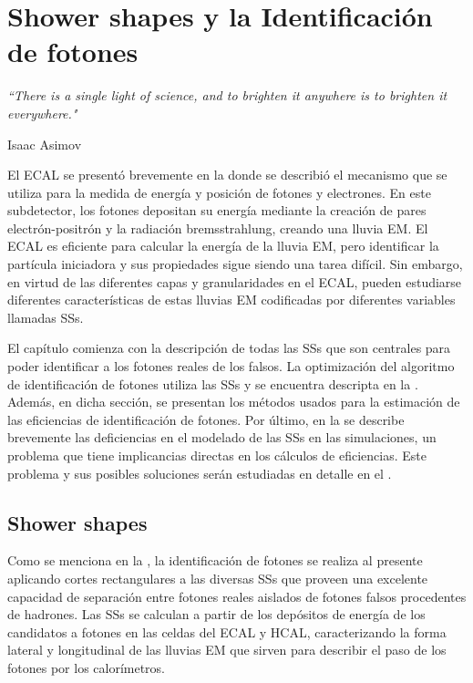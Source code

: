 \chapter{Shower shapes y la Identificación de fotones}
\label{ch:pid_ss}
\epigraph{\emph{``There is a single light of science, and to brighten it anywhere is to brighten it everywhere."}}{Isaac Asimov}




El \ac{ECAL} se presentó brevemente en la \Sect{\ref{subsubsec:atlas:atlas:cals:ecal}} donde se describió el mecanismo que se utiliza para la medida de energía y posición de fotones y electrones. En este subdetector, los fotones depositan su energía mediante la creación de pares electrón-positrón y la radiación bremsstrahlung, creando una lluvia \acf{EM}. El \ac{ECAL} es eficiente para calcular la energía de la lluvia \ac{EM}, pero identificar la partícula iniciadora y sus propiedades sigue siendo una tarea difícil.
Sin embargo, en virtud de las diferentes capas y granularidades en el \ac{ECAL}, pueden estudiarse diferentes características de estas lluvias \ac{EM} codificadas por diferentes variables llamadas \acfp{SS}.

El capítulo comienza con la descripción de todas las \acp{SS} que son centrales para poder identificar a los fotones reales de los falsos.
La optimización del algoritmo de identificación de fotones utiliza las \acp{SS} y se encuentra descripta en la \Sect{\ref{sec:pid_ss:pid}}. Además, en dicha sección, se presentan los métodos usados para la estimación de las eficiencias de identificación de fotones.
Por último, en la \Sect{\ref{sec:pid_ss:ss_differences}} se describe brevemente las deficiencias en el modelado de las \acp{SS} en las simulaciones, un problema que tiene implicancias directas en los cálculos de eficiencias. Este problema y sus posibles soluciones serán estudiadas en detalle en el \Ch{\ref{ch:ss_corrections}}.






\section{Shower shapes}
\label{sec:pid_ss:ss}

Como se menciona en la \Sect{\ref{subsec:objects:egamma:id}}, la identificación de fotones se realiza al presente aplicando cortes rectangulares a las diversas \acp{SS} que proveen una excelente capacidad de separación entre fotones reales aislados de fotones falsos procedentes de hadrones. Las \acp{SS} se calculan a partir de los depósitos de energía de los candidatos a fotones en las celdas del \ac{ECAL} y \ac{HCAL}, caracterizando la forma lateral y longitudinal de las lluvias \ac{EM} que sirven para describir el paso de los fotones por los calorímetros.

